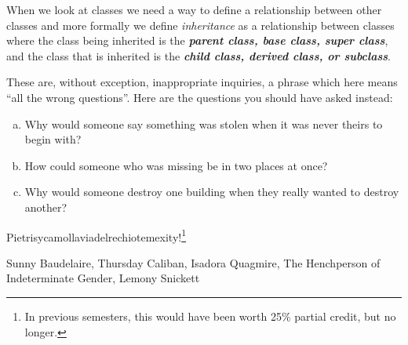 \documentclass[11pt]{article}
\begin{document}



When we look at classes we need a way to define a relationship between other classes and more formally we define 
\emph{inheritance} as a relationship between classes where the class being inherited is the \textbf{\emph{parent class, base class, super class}}, and
the class that is inherited is the \textbf{\emph{child class, derived class, or subclass}}.

\newpage

\begin{solution}
These are, without exception, inappropriate inquiries, a phrase which here means “all the wrong questions”.  Here are the questions you should have asked instead:
\begin{enumerate}[(a)]
\item Why would someone say something was stolen when it was never theirs to begin with?
\item How could someone who was missing be in two places at once?
\item Why would someone destroy one building when they really wanted to destroy another?
\end{enumerate}
\end{solution}

\begin{solution}
Pietrisycamollaviadelrechiotemexity!\footnote{In previous semesters, this would have been worth 25\% partial credit, but no longer.}
\end{solution}

\begin{Sources}
Sunny Baudelaire, Thursday Caliban, Isadora Quagmire, The Henchperson of Indeterminate Gender, Lemony Snickett
\end{Sources}




\newtheorem{lemma}{Lemma}
\end{document}
